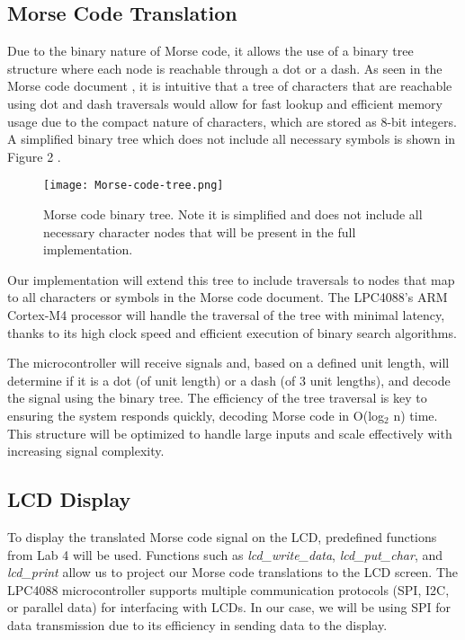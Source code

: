 \documentclass{cce2014-design}
\begin{document}
\subsection{Morse Code Translation}
Due to the binary nature of Morse code, it allows the use of a binary tree structure where each node is reachable through a dot or a dash. As seen in the Morse code document \cite{itu2009}, it is intuitive that a tree of characters that are reachable using dot and dash traversals would allow for fast lookup and efficient memory usage due to the compact nature of characters, which are stored as 8-bit integers. A simplified binary tree which does not include all necessary symbols is shown in Figure 2 \cite{morsecode-tree}.

\begin{figure}[h]
    \centering
    \texttt{[image: Morse-code-tree.png]}
    \caption{Morse code binary tree. Note it is simplified and does not include all necessary character nodes that will be present in the full implementation.}
    \label{fig:morse_tree}
\end{figure}

Our implementation will extend this tree to include traversals to nodes that map to all characters or symbols in the Morse code document. The LPC4088's ARM Cortex-M4 processor will handle the traversal of the tree with minimal latency, thanks to its high clock speed and efficient execution of binary search algorithms.

The microcontroller will receive signals and, based on a defined unit length, will determine if it is a dot (of unit length) or a dash (of 3 unit lengths), and decode the signal using the binary tree. The efficiency of the tree traversal is key to ensuring the system responds quickly, decoding Morse code in O(log$_2$ n) time. This structure will be optimized to handle large inputs and scale effectively with increasing signal complexity.

\subsection{LCD Display}
To display the translated Morse code signal on the LCD, predefined functions from Lab 4 will be used. Functions such as \textit{lcd\_write\_data}, \textit{lcd\_put\_char}, and \textit{lcd\_print} allow us to project our Morse code translations to the LCD screen. The LPC4088 microcontroller supports multiple communication protocols (SPI, I2C, or parallel data) for interfacing with LCDs. In our case, we will be using SPI for data transmission due to its efficiency in sending data to the display.
\end{document}
